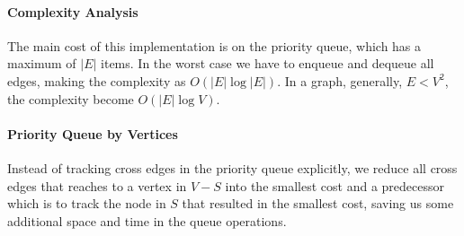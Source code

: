 \documentclass[../main.tex]{subfiles}
\begin{document}
\paragraph{Complexity Analysis} The main cost of this implementation is on the priority queue, which has a maximum of $|E|$ items. In the worst case we have to enqueue and dequeue all edges, making the complexity as $O(|E|\log|E|)$. In a graph, generally, $E < V^2$, the complexity become $O(|E|\log V)$.
\paragraph{Priority Queue by Vertices}
Instead of tracking cross edges in the priority queue explicitly, we reduce all cross edges that reaches to a vertex in $V-S$ into the smallest cost and a predecessor which is to track the node in $S$ that resulted in the smallest cost, saving us some additional space and time in the queue operations. 
\end{document}

